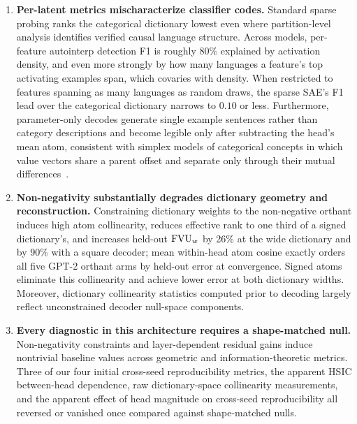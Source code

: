 \begin{enumerate}
{language.} Consistent with SONAR's design as a language-agnostic semantic
embedding, the strongest head (by $\eta^2$) partitions inputs by broad topic and
genre, and is the single head that recurs across random seeds. Source language, the corpus's primary free ground-truth label, served as a
diagnostic probe rather than an expected single-head variable: language
identity is distributed across multi-head neighborhoods rather than
isolated in a single head, reflecting the weak separation of languages in
SONAR space. On that probe, the hard code captures $3.5$--$3.9\times$ as
much language information as the softmax reference, confirming that
learned partitions align with known attributes above chance; directly
testing whether heads recover natural semantic variables will require
topic and genre annotations.
\item \textbf{Per-latent metrics mischaracterize classifier codes.}
Standard sparse probing ranks the categorical dictionary lowest even where
partition-level analysis identifies verified causal language structure.
Across models, per-feature autointerp detection F1 is roughly 80\%
explained by activation density, and even more strongly by how many
languages a feature's top activating examples span, which covaries with
density. When restricted to features spanning as many languages as random
draws, the sparse SAE's F1 lead over the categorical dictionary narrows
to $0.10$ or less. Furthermore, parameter-only decodes generate single example
sentences rather than category descriptions and become legible only after
subtracting the head's mean atom, consistent with simplex models of
categorical concepts in which value vectors share a parent offset and
separate only through their mutual differences~\cite{park2025}.
\item \textbf{Non-negativity substantially degrades dictionary geometry
and reconstruction.} Constraining dictionary weights to the non-negative
orthant induces high atom collinearity, reduces effective rank to one
third of a signed dictionary's, and increases held-out $\mathrm{FVU}_w$ by 26\% at
the wide dictionary and by 90\% with a square decoder; mean within-head
atom cosine exactly orders all five GPT-2 orthant arms by held-out error
at convergence. Signed atoms eliminate this collinearity and achieve
lower error at both dictionary widths. Moreover, dictionary collinearity
statistics computed prior to decoding largely reflect unconstrained
decoder null-space components.
\item \textbf{Every diagnostic in this architecture requires a
shape-matched null.} Non-negativity constraints and layer-dependent
residual gains induce nontrivial baseline values across geometric and
information-theoretic metrics. Three of our four initial cross-seed
reproducibility metrics, the apparent HSIC between-head dependence, raw
dictionary-space collinearity measurements, and the apparent effect of
head magnitude on cross-seed reproducibility all reversed or vanished
once compared against shape-matched nulls.
\end{enumerate}

